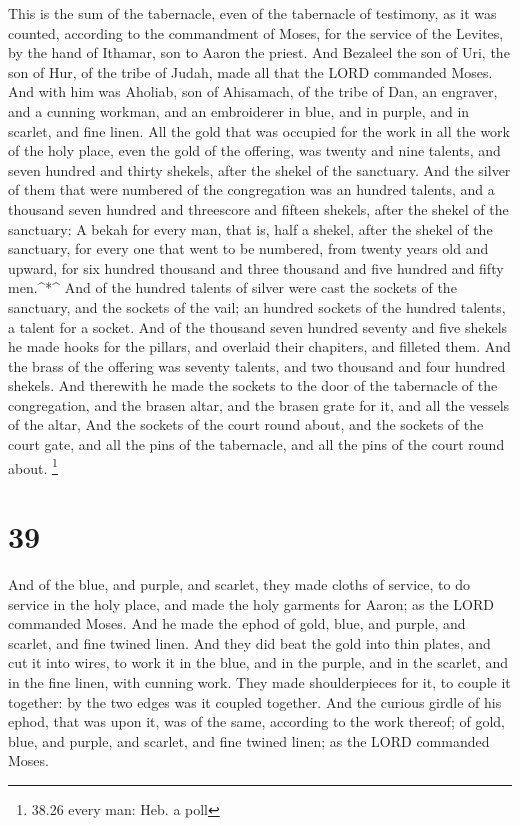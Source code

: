  This is the sum of the tabernacle, even of the tabernacle
of testimony, as it was counted, according to the commandment of Moses,
for the service of the Levites, by the hand of Ithamar, son to Aaron the
priest.  And Bezaleel the son of Uri, the son of Hur, of
the tribe of Judah, made all that the LORD commanded Moses.
 And with him was Aholiab, son of Ahisamach, of the tribe
of Dan, an engraver, and a cunning workman, and an embroiderer in blue,
and in purple, and in scarlet, and fine linen.  All the
gold that was occupied for the work in all the work of the holy place,
even the gold of the offering, was twenty and nine talents, and seven
hundred and thirty shekels, after the shekel of the sanctuary.
 And the silver of them that were numbered of the
congregation was an hundred talents, and a thousand seven hundred and
threescore and fifteen shekels, after the shekel of the sanctuary:
 A bekah for every man, that is, half a shekel, after the
shekel of the sanctuary, for every one that went to be numbered, from
twenty years old and upward, for six hundred thousand and three thousand
and five hundred and fifty men.\^{}*\^{}  And of the
hundred talents of silver were cast the sockets of the sanctuary, and
the sockets of the vail; an hundred sockets of the hundred talents, a
talent for a socket.  And of the thousand seven hundred
seventy and five shekels he made hooks for the pillars, and overlaid
their chapiters, and filleted them.  And the brass of the
offering was seventy talents, and two thousand and four hundred shekels.
 And therewith he made the sockets to the door of the
tabernacle of the congregation, and the brasen altar, and the brasen
grate for it, and all the vessels of the altar,  And the
sockets of the court round about, and the sockets of the court gate, and
all the pins of the tabernacle, and all the pins of the court round
about. \footnote{38.26 every man: Heb. a poll}

\hypertarget{section-38}{%
\section{39}\label{section-38}}

 And of the blue, and purple, and scarlet, they made cloths
of service, to do service in the holy place, and made the holy garments
for Aaron; as the LORD commanded Moses.  And he made the
ephod of gold, blue, and purple, and scarlet, and fine twined linen.
 And they did beat the gold into thin plates, and cut it
into wires, to work it in the blue, and in the purple, and in the
scarlet, and in the fine linen, with cunning work.  They
made shoulderpieces for it, to couple it together: by the two edges was
it coupled together.  And the curious girdle of his ephod,
that was upon it, was of the same, according to the work thereof; of
gold, blue, and purple, and scarlet, and fine twined linen; as the LORD
commanded Moses.

